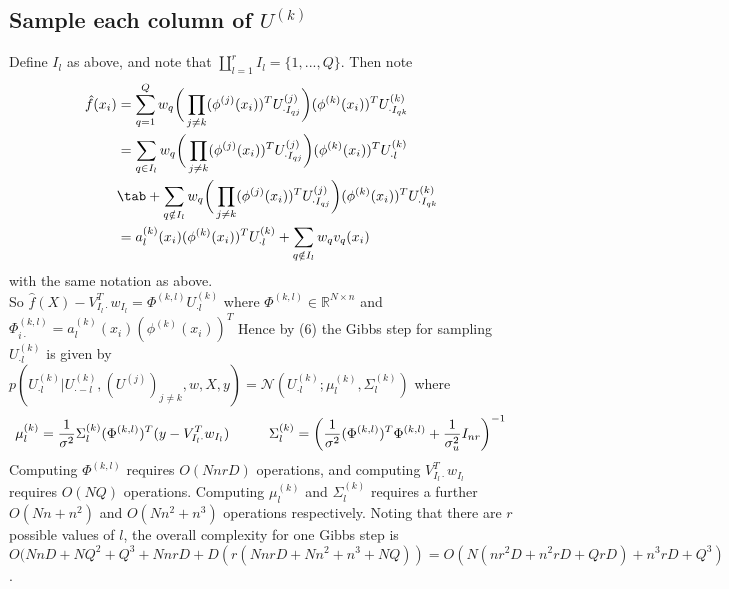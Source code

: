 \documentclass[a4paper,10pt]{article}
\begin{document}
\subsection{Sample each column of $U^{(k)}$}
Define $I_l$ as above, and note that  $\coprod\limits_{l=1}^r I_l = \{1,...,Q\}$. Then note
\begin{equation}
\begin{aligned}
\hat{f}(x_i)
& =\sum_{q=1}^Q w_q \bigg(\prod_{j \neq k} (\phi^{(j)}(x_i))^T U^{(j)}_{\cdot I_{qj}}\bigg)(\phi^{(k)}(x_i))^T U^{(k)}_{\cdot I_{qk}}  \\
& =\sum_{q \in I_l} w_q \bigg(\prod_{j \neq k} (\phi^{(j)}(x_i))^T U^{(j)}_{\cdot I_{qj}}\bigg)(\phi^{(k)}(x_i))^T U^{(k)}_{\cdot l} \\
& \tab +\sum_{q \notin I_l } w_q \bigg(\prod_{j \neq k} (\phi^{(j)}(x_i))^T U^{(j)}_{\cdot I_{qj}}\bigg)(\phi^{(k)}(x_i))^T U^{(k)}_{\cdot I_{qk}} \\
& =a_l^{(k)}(x_i) (\phi^{(k)}(x_i))^T U^{(k)}_{\cdot l} + \sum_{q \notin I_l} w_q v_q(x_i) 
\end{aligned}
\end{equation}
with the same notation as above. \\
So $\hat{f}(X) - V_{I_l \cdot }^T w_{I_l} = \Phi^{(k,l)} U^{(k)}_{\cdot l}$ where  $\Phi^{(k,l)} \in \mathbb{R}^{N \times n}$ and $\Phi^{(k,l)}_{i \cdot} = a_l^{(k)}(x_i) (\phi^{(k)}(x_i))^T$
Hence by (6) the Gibbs step for sampling $U^{(k)}_{\cdot l}$ is given by \\
$p(U^{(k)}_{\cdot l}|U^{(k)}_{\cdot -l}, (U^{(j)})_{j \neq k},w,X,y)=\mathcal{N}(U^{(k)}_{\cdot l};\mu^{(k)}_l,\Sigma^{(k)}_l)$ where
\begin{equation}
\mu^{(k)}_l=\frac{1}{\sigma^2}\Sigma^{(k)}_l (\Phi^{(k,l)})^T (y-V_{I_l \cdot }^T w_{I_l})  \hspace{10 mm} \Sigma^{(k)}_l = \bigg( \frac{1}{\sigma^2}(\Phi^{(k,l)})^T\Phi^{(k,l)} + \frac{1}{\sigma_u^2}I_{nr} \bigg) ^{-1}
\end{equation}
Computing $\Phi^{(k,l)}$ requires $O(NnrD)$ operations,  and computing $V_{I_l \cdot }^T w_{I_l}$ requires $O(NQ)$ operations. Computing $\mu^{(k)}_l$ and $\Sigma^{(k)}_l$ requires a further $O(Nn+n^2)$ and $O(Nn^2+n^3)$ operations respectively. Noting that there are $r$ possible values of $l$, the overall complexity for one Gibbs step is $O(NnD+NQ^2+Q^3+NnrD+D(r(NnrD+Nn^2+n^3+NQ))=O(N(nr^2D+n^2rD+QrD)+n^3rD+Q^3)$.
\end{document}
